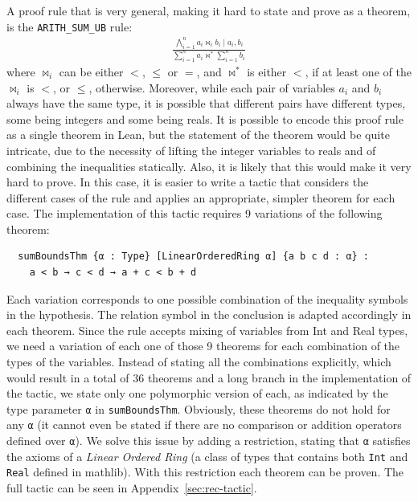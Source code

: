 \documentclass[runningheads]{llncs}
\begin{document}
\begin{example}
  A proof rule that is very general, making it hard to state and prove as a
  theorem, is the \texttt{ARITH\_SUM\_UB} rule:
%
  \begin{align*}
    \frac{\bigwedge_{i = 1}^{n} a_{i} \bowtie_{i} b_{i} \mid a_i, b_i}{\sum_{i = 1}^{n} a_{i} \bowtie^{*} \sum_{i = 1}^{n} b_{i}}
  \end{align*}
  where $\bowtie_i$ can be either $<$, $\leq$ or $=$, and $\bowtie^{*}$ is
  either $<$, if at least one of the $\bowtie_i$ is $<$, or $\leq$, otherwise.
  Moreover, while each pair of variables
  $a_i$ and $b_i$ always have the same type, it is possible that different
  pairs have different types, some being integers and some being reals.
  It is possible to encode this proof rule as a single theorem in Lean, but the
  statement of the theorem would be quite intricate, due to the necessity of
  lifting the integer variables to reals and of combining the inequalities
  statically.
  Also, it is likely that this would make it very hard to prove.
  In this case, it is easier to write a tactic that considers the different
  cases of the rule and applies an appropriate, simpler theorem for each case.
  The implementation of this tactic requires 9 variations of the following theorem:

\begin{lstlisting}
  sumBoundsThm {α : Type} [LinearOrderedRing α] {a b c d : α} :
    a < b → c < d → a + c < b + d
\end{lstlisting}

  Each variation corresponds to one possible combination of the inequality symbols in the hypothesis. The relation symbol in the conclusion is
  adapted accordingly in each theorem. Since the rule accepts mixing of variables
  from Int and Real types, we need a variation of each one of those 9 theorems for each combination
  of the types of the variables. Instead of stating all the combinations explicitly, which would
  result in a total of 36 theorems and a long branch in the implementation of the tactic,
  we state only one polymorphic version of each, as indicated by the type parameter \texttt{α} in \texttt{sumBoundsThm}.
  Obviously, these theorems do not hold
  for any \texttt{α} (it cannot even be stated if there are no comparison or addition operators defined over \texttt{α}).
  We solve this issue by adding a restriction, stating that \texttt{α} satisfies the axioms of a
  \textit{Linear Ordered Ring} (a class of types that contains both \texttt{Int} and \texttt{Real} defined in mathlib).
  With this restriction each theorem can be proven. The full tactic can be
  seen in Appendix~\ref{sec:rec-tactic}.

\end{example}
\end{document}
